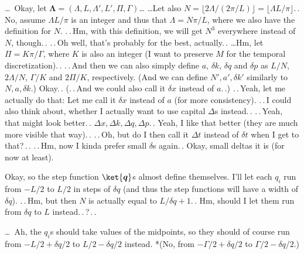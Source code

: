 \documentclass{report}
\begin{document}
\ldots\ Okay, let $\boldsymbol{\Lambda} = (\Lambda, L, \Lambda', L', \Pi, \Gamma)$\ldots 
\ldots Let also $N=\lfloor 2 \Lambda / (2\pi / L)\rfloor = \lfloor\Lambda L / \pi \rfloor$.\,. No, assume $\Lambda L / \pi$ is an integer and thus that $\Lambda = N \pi / L$, where we also have the definition for $N$. .\,.\,Hm, with this definition, we will get $N^3$ everywhere instead of $N$, though.\,. .\,.\,Oh well, that's probably for the best, actually.\,. \ldots Hm, let $\Pi = K \pi / \Gamma$, where $K$ is also an integer (I want to preserve $M$ for the temporal discretization).\,. .\,.\,And then we can also simply define $a$, $\delta k$, $\delta q$ and $\delta p$ as $L/N$, $2\Lambda / N$, $\Gamma / K$ and $2\Pi / K$, respectively. (And we can define $N', a', \delta k'$ similarly to $N, a, \delta k$.) Okay.\,. (.\,.\,And we could also call it $\delta x$ instead of $a$.\,.) .\,.\,Yeah, let me actually do that: Let me call it $\delta x$ instead of $a$ (for more consistency). .\,.\,I could also think about, whether I actually want to use capital $\Delta$s instead.\,. .\,.\,Yeah, that might look better.\,. $\Delta x, \Delta k, \Delta q, \Delta p$.\,. Yeah, I like that better (they are much more visible that way).\,. .\,.\,Oh, but do I then call it $\Delta t$ instead of $\delta t$ when I get to that?\,.\,. .\,.\,Hm, now I kinda prefer small $\delta$s again.\,. Okay, small deltas it is (for now at least). 

Okay, so the step function $\ket{\boldsymbol q}$s almost define themselves. I'll let each $q_i$ run from $-L/2$ to $L/2$ in steps of $\delta q$ (and thus the step functions will have a width of $\delta q$). .\,.\,Hm, but then $N$ is actually equal to $L/ \delta q + 1$.\,. Hm, should I let them run from $\delta q$ to $L$ instead.\,.\,?\,.\,. %

\ldots\ Ah, the $q_i$s should take values of the midpoints, so they should of course run from $-L/2 + \delta q /2$ to $L/2 - \delta q / 2$ instead. *(No, from $-\Gamma/2 + \delta q /2$ to $\Gamma/2 - \delta q / 2$.)
\end{document}
